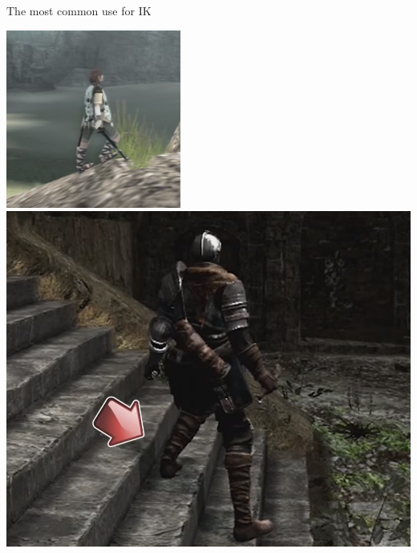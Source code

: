 \begin{frame}{The most common use for IK}
\begin{center}
		\includegraphics[height=0.4\textheight]{ik_feet4} \quad
		\includegraphics[height=0.4\textheight]{ik_feet}
	\end{center}
\end{frame}

